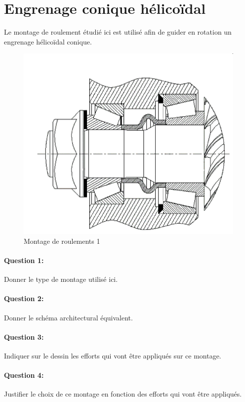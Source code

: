 

\section{Engrenage conique hélicoïdal}

Le montage de roulement étudié ici est utilisé afin de guider en rotation un engrenage hélicoïdal conique.

\begin{figure}[!h]
	\begin{center}
	\includegraphics[width=0.6\linewidth]{img/Picture1}
		\caption{Montage de roulements 1}
		\label{fig:image1}
	\end{center}
\end{figure}

\paragraph{Question 1:} Donner le type de montage utilisé ici.

\paragraph{Question 2:} Donner le schéma architectural équivalent.

\paragraph{Question 3:} Indiquer sur le dessin les efforts qui vont être appliqués sur ce montage.

\paragraph{Question 4:} Justifier le choix de ce montage en fonction des efforts qui vont être appliqués.


